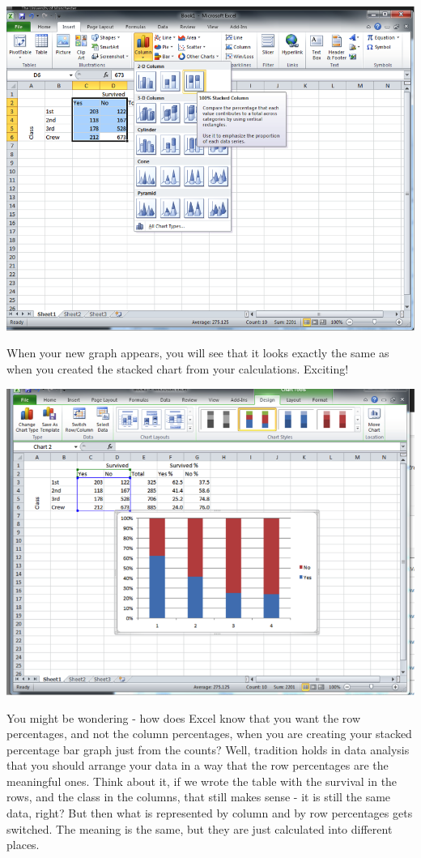 \documentclass[
]{book}
\begin{document}
\includegraphics{imgs/stacked_col_perc.png}

When your new graph appears, you will see that it looks exactly the same as when you created the stacked chart from your calculations. Exciting!

\includegraphics{imgs/stacked_col_perc_2.png}

You might be wondering - how does Excel know that you want the row percentages, and not the column percentages, when you are creating your stacked percentage bar graph just from the counts? Well, tradition holds in data analysis that you should arrange your data in a way that the row percentages are the meaningful ones. Think about it, if we wrote the table with the survival in the rows, and the class in the columns, that still makes sense - it is still the same data, right? But then what is represented by column and by row percentages gets switched. The meaning is the same, but they are just calculated into different places.
\end{document}
